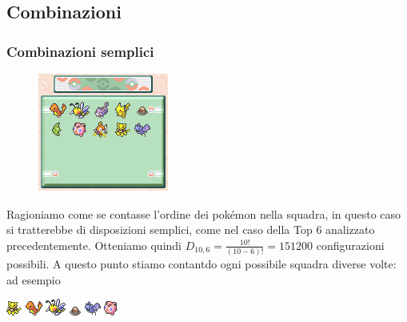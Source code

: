 \documentclass{article}     %
\begin{document}
        \subsection{Combinazioni}
            \subsubsection{Combinazioni semplici}
            \begin{ex}
                
            
            \begin{figure}
                \includegraphics[width=0.9\linewidth]{pkmn/Box.png} 
            \end{figure}
            Ragioniamo come se contasse l'ordine dei pokémon nella squadra, in questo caso si tratterebbe di disposizioni semplici, come nel caso della Top 6 analizzato precedentemente. Otteniamo quindi $D_{10,6}=\frac{10!}{(10-6)!}=151200$ configurazioni possibili. A questo punto stiamo contantdo ogni possibile squadra diverse volte: ad esempio
            \begin{center}
                \includegraphics{pkmn/A.png} \includegraphics{pkmn/C.png} \includegraphics{pkmn/B.png} \includegraphics{pkmn/D.png} \includegraphics{pkmn/Z.png} \includegraphics{pkmn/J.png}

\end{center}
\end{ex}
\end{document}
